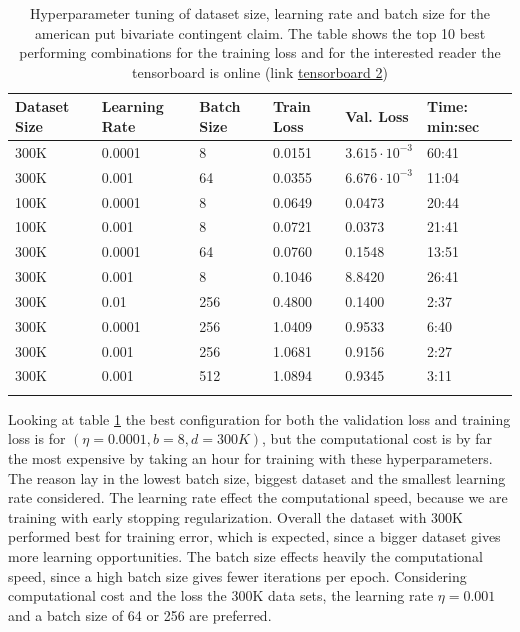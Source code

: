 \begin{table}[th]
\caption{Hyperparameter tuning of dataset size, learning rate and batch size for the american put bivariate contingent claim. The table shows the top 10 best performing combinations for the training loss and for the interested reader the tensorboard is online (link \href{https://tensorboard.dev/experiment/mQWtOskJRoWrmrFgOIVQ4g/}{tensorboard 2})}
\label{tab:hyperAmerMin1}
\centering
\begin{tabular}{llllll}
\toprule
\textbf{Dataset Size} & \textbf{Learning Rate} & \textbf{Batch Size} & \textbf{Train Loss} & \textbf{Val. Loss} & \textbf{Time: min:sec} \\
\midrule
300K    & 0.0001 & 8     & 0.0151 & $3.615\cdot 10^{-3}$ & 60:41\\ 
300K    & 0.001  & 64    & 0.0355 & $6.676\cdot 10^{-3}$ & 11:04\\ 
100K    & 0.0001 & 8     & 0.0649 & 0.0473 & 20:44\\ 
100K    & 0.001  & 8     & 0.0721 & 0.0373 & 21:41\\ 
300K    & 0.0001 & 64    & 0.0760 & 0.1548 & 13:51\\ 
300K    & 0.001  & 8     & 0.1046 & 8.8420 & 26:41\\ 
300K    & 0.01   & 256   & 0.4800 & 0.1400 & 2:37\\ 
300K    & 0.0001 & 256   & 1.0409 & 0.9533 & 6:40\\ 
300K    & 0.001  & 256   & 1.0681 & 0.9156 & 2:27 \\ 
300K    & 0.001  & 512   & 1.0894 & 0.9345 & 3:11 \\ 
\bottomrule\\
\end{tabular}
\end{table}

Looking at table \ref{tab:hyperAmerMin1} the best configuration for both the validation loss and training loss is for $(\eta=0.0001, b=8, d=300K)$, but the computational cost is by far the most expensive by taking an hour for training with these hyperparameters. The reason lay in the lowest batch size, biggest dataset and the smallest learning rate considered. The learning rate effect the computational speed, because we are training with early stopping regularization. Overall the dataset with 300K performed best for training error, which is expected, since a bigger dataset gives more learning opportunities. The batch size effects heavily the computational speed, since a high batch size gives fewer iterations per epoch. Considering computational cost and the loss the 300K data sets, the learning rate $\eta=0.001$ and a batch size of 64 or 256 are preferred.\\


